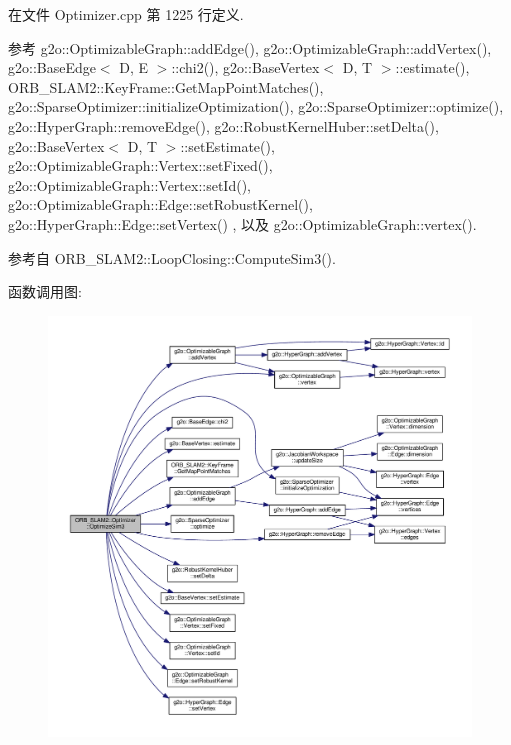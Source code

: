 在文件 Optimizer.\-cpp 第 1225 行定义.



参考 g2o\-::\-Optimizable\-Graph\-::add\-Edge(), g2o\-::\-Optimizable\-Graph\-::add\-Vertex(), g2o\-::\-Base\-Edge$<$ D, E $>$\-::chi2(), g2o\-::\-Base\-Vertex$<$ D, T $>$\-::estimate(), O\-R\-B\-\_\-\-S\-L\-A\-M2\-::\-Key\-Frame\-::\-Get\-Map\-Point\-Matches(), g2o\-::\-Sparse\-Optimizer\-::initialize\-Optimization(), g2o\-::\-Sparse\-Optimizer\-::optimize(), g2o\-::\-Hyper\-Graph\-::remove\-Edge(), g2o\-::\-Robust\-Kernel\-Huber\-::set\-Delta(), g2o\-::\-Base\-Vertex$<$ D, T $>$\-::set\-Estimate(), g2o\-::\-Optimizable\-Graph\-::\-Vertex\-::set\-Fixed(), g2o\-::\-Optimizable\-Graph\-::\-Vertex\-::set\-Id(), g2o\-::\-Optimizable\-Graph\-::\-Edge\-::set\-Robust\-Kernel(), g2o\-::\-Hyper\-Graph\-::\-Edge\-::set\-Vertex() , 以及 g2o\-::\-Optimizable\-Graph\-::vertex().



参考自 O\-R\-B\-\_\-\-S\-L\-A\-M2\-::\-Loop\-Closing\-::\-Compute\-Sim3().



函数调用图\-:
\nopagebreak
\begin{figure}[H]
\begin{center}
\leavevmode
\includegraphics[width=350pt]{classORB__SLAM2_1_1Optimizer_ad8fe00ad3e6564b859b07ff9e7b2224e_cgraph}
\end{center}
\end{figure}




